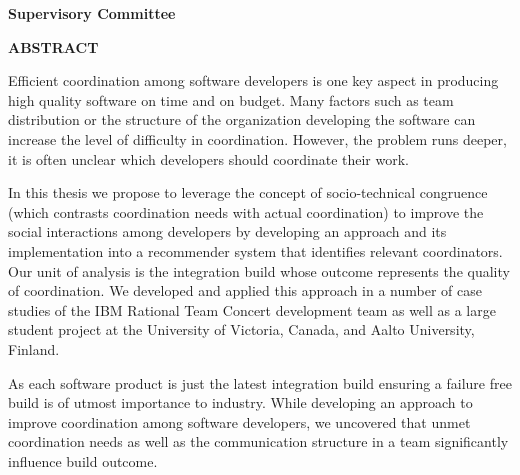 \newpage
{}

\noindent \textbf{Supervisory Committee}
\tpbreak
\panel

\begin{center}
\textbf{ABSTRACT}
\end{center}
Efficient coordination among software developers is one key aspect in producing high quality software on time and on budget.
Many factors such as team distribution or the structure of the organization developing the software can increase the level of difficulty in coordination.
However, the problem runs deeper, it is often unclear which developers should coordinate their work.

In this thesis we propose to leverage the concept of socio-technical congruence (which contrasts coordination needs with actual coordination) to improve the social interactions among developers 
by developing an approach and its implementation into a recommender system that identifies relevant coordinators.
Our unit of analysis is the integration build whose outcome represents the quality of coordination.
We developed and applied this approach in a number of case studies of the IBM Rational Team Concert development team as well as a large student project at the University of Victoria, Canada, and Aalto University, Finland.

As each software product is just the latest integration build ensuring a failure free build is of utmost importance to industry.
While developing an approach to improve coordination among software developers, we uncovered that unmet coordination needs as well as the communication structure in a team significantly influence build outcome.
